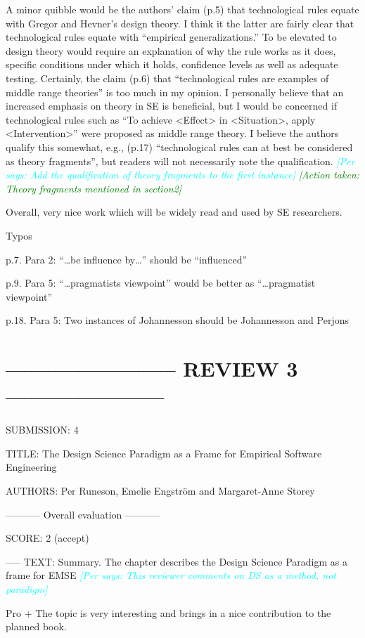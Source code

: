 \documentclass{article}
\newcommand{\per}[1]{\textcolor{cyan}{{\it [Per says: #1]}}}
\newcommand{\action}[1]{\textcolor{green}{{\it [Action taken: #1]}}}
\newcommand{\per}[1]{}
\newcommand{\action}[1]{}
\begin{document}
A minor quibble would be the authors’ claim (p.5) that technological rules equate with Gregor and Hevner’s design theory.  I think it the latter are fairly clear that technological rules equate with “empirical generalizations.”  To be elevated to design theory would require an explanation of why the rule works as it does, specific conditions under which it holds, confidence levels as well as adequate testing. Certainly, the claim (p.6) that “technological rules are examples of middle range theories” is too much in my opinion. I personally believe that an increased emphasis on theory in SE is beneficial, but I would be concerned if technological rules such as “To achieve <Effect> in <Situation>, apply <Intervention>” were proposed as middle range theory. I believe the authors qualify this somewhat, e.g., (p.17) “technological rules can at best be considered as theory fragments”, but readers will not necessarily note the qualification. \per{Add the qualification of theory \emph{fragments} to the first instance} \action{Theory fragments mentioned in section2}
 
Overall, very nice work which will be widely read and used by SE researchers.
 

Typos
 
p.7. Para 2: “…be influence by…” should be “influenced”
 
p.9. Para 5: “…pragmatists viewpoint” would be better as “…pragmatist viewpoint”
 
p.18. Para 5: Two instances of Johannesson should be Johannesson and Perjons



\section*{----------------------- REVIEW 3 ---------------------}
SUBMISSION: 4

TITLE: The Design Science Paradigm as a Frame for Empirical Software Engineering

AUTHORS: Per Runeson, Emelie Engström and Margaret-Anne Storey

----------- Overall evaluation -----------

SCORE: 2 (accept)

----- TEXT:
Summary. The chapter describes the Design Science Paradigm as a frame for EMSE 
\per{This reviewer comments on DS as a method, not paradigm}

Pro
+ The topic is very interesting and brings in a nice contribution to the planned book.
\end{document}
